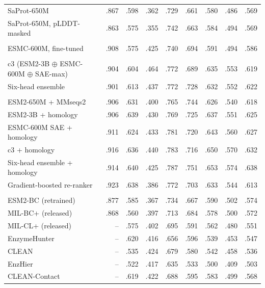 \documentclass[11pt]{article}
\begin{document}
{\begin{longtable}{@{}lrrrrrrrr@{}}
\quad SaProt-650M & .867 & .598 & .362 & .729 & .661 & .580 & .486 & .569 \\
\quad SaProt-650M, pLDDT-masked & .863 & .575 & .355 & .742 & .663 & .584 & .494 & .569 \\
\addlinespace\multicolumn{9}{l}{\textit{Fine-tuned PLM}}\\
\quad ESMC-600M, fine-tuned & .908 & .575 & .425 & .740 & .694 & .591 & .494 & .586 \\
\addlinespace\multicolumn{9}{l}{\textit{PLM combination}}\\
\quad c3 (ESM2-3B $\oplus$ ESMC-600M $\oplus$ SAE-max) & .904 & .604 & .464 & .772 & .689 & .635 & .553 & .619 \\
\quad Six-head ensemble & .901 & .613 & .437 & .772 & .728 & .632 & .552 & .622 \\
\addlinespace\multicolumn{9}{l}{\textit{PLM + homology}}\\
\quad ESM2-650M + MMseqs2 & .906 & .631 & .400 & .765 & .744 & .626 & .540 & .618 \\
\quad ESM2-3B + homology & .906 & .639 & .430 & .769 & .725 & .637 & .551 & .625 \\
\quad ESMC-600M SAE + homology & .911 & .624 & .433 & .781 & .720 & .643 & .560 & .627 \\
\quad c3 + homology & .916 & .636 & .440 & .783 & .716 & .650 & .570 & .632 \\
\quad Six-head ensemble + homology & .914 & .640 & .425 & .787 & .751 & .653 & .574 & .638 \\
\quad Gradient-boosted re-ranker & .923 & .638 & .386 & .772 & .703 & .633 & .544 & .613 \\
\addlinespace\multicolumn{9}{l}{\textit{Published method}}\\
\quad ESM2-BC (retrained) & .877 & .585 & .367 & .734 & .667 & .590 & .502 & .574 \\
\quad MIL-BC+ (released) & .868 & .560 & .397 & .713 & .684 & .578 & .500 & .572 \\
\quad MIL-CL+ (released) & -- & .575 & .402 & .695 & .591 & .562 & .480 & .551 \\
\quad EnzymeHunter & -- & .620 & .416 & .656 & .596 & .539 & .453 & .547 \\
\quad CLEAN & -- & .535 & .424 & .679 & .580 & .542 & .458 & .536 \\
\quad EnzHier & -- & .522 & .417 & .635 & .533 & .500 & .409 & .503 \\
\quad CLEAN-Contact & -- & .619 & .422 & .688 & .595 & .583 & .499 & .568 \\
\bottomrule
\end{longtable}}
\end{document}
